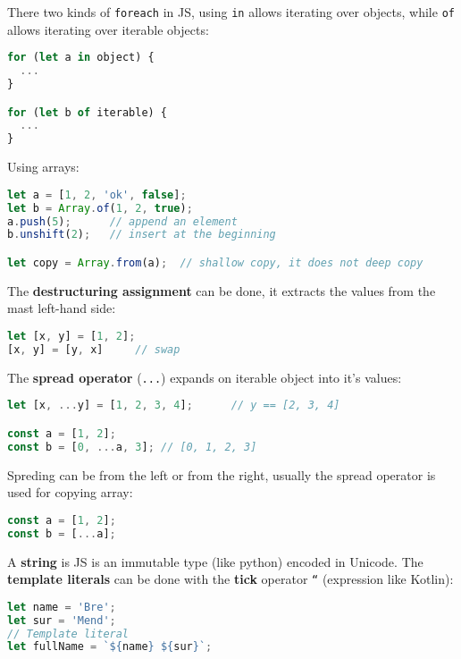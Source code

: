 \documentclass[12pt]{article}
\begin{document}
There two kinds of \texttt{foreach} in JS, using \texttt{in} allows iterating over objects, while \texttt{of} allows iterating over iterable objects:
\begin{lstlisting}[language=javascript]
for (let a in object) {
  ...
}

for (let b of iterable) {
  ...
}
\end{lstlisting}
Using arrays:
\begin{lstlisting}[language=javascript]
let a = [1, 2, 'ok', false];
let b = Array.of(1, 2, true);
a.push(5);      // append an element
b.unshift(2);   // insert at the beginning

let copy = Array.from(a);  // shallow copy, it does not deep copy
\end{lstlisting}
The \textbf{destructuring assignment} can be done, it extracts the values from the mast left-hand side:
\begin{lstlisting}[language=javascript]
let [x, y] = [1, 2];
[x, y] = [y, x]     // swap
\end{lstlisting}
The \textbf{spread operator} (\texttt{...}) expands on iterable object into it's values:
\begin{lstlisting}[language=javascript]
let [x, ...y] = [1, 2, 3, 4];      // y == [2, 3, 4]

const a = [1, 2];
const b = [0, ...a, 3]; // [0, 1, 2, 3]
\end{lstlisting}
Spreding can be from the left or from the right, usually the spread operator is used for copying array:
\begin{lstlisting}[language=javascript]
const a = [1, 2];
const b = [...a];
\end{lstlisting}
A \textbf{string} is JS is an immutable type (like python) encoded in Unicode. The \textbf{template literals} can be done with the \textbf{tick} operator \texttt{``} (expression like Kotlin):
\begin{lstlisting}[language=javascript]
let name = 'Bre';
let sur = 'Mend';
// Template literal
let fullName = `${name} ${sur}`;
\end{lstlisting}
\end{document}
